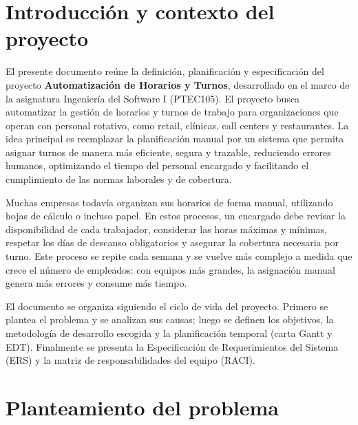 \documentclass[12pt,letterpaper]{article}
\newcommand{\tituloProyecto}{Automatización de Horarios y Turnos}
\begin{document}
\tableofcontents
\newpage
{}

\section{Introducción y contexto del proyecto}

El presente documento reúne la definición, planificación y especificación del proyecto \textbf{\tituloProyecto}, desarrollado en el marco de la asignatura Ingeniería del Software I (PTEC105). El proyecto busca automatizar la gestión de horarios y turnos de trabajo para organizaciones que operan con personal rotativo, como retail, clínicas, call centers y restaurantes. La idea principal es reemplazar la planificación manual por un sistema que permita asignar turnos de manera más eficiente, segura y trazable, reduciendo errores humanos, optimizando el tiempo del personal encargado y facilitando el cumplimiento de las normas laborales y de cobertura.

Muchas empresas todavía organizan sus horarios de forma manual, utilizando hojas de cálculo o incluso papel. En estos procesos, un encargado debe revisar la disponibilidad de cada trabajador, considerar las horas máximas y mínimas, respetar los días de descanso obligatorios y asegurar la cobertura necesaria por turno. Este proceso se repite cada semana y se vuelve más complejo a medida que crece el número de empleados: con equipos más grandes, la asignación manual genera más errores y consume más tiempo.

El documento se organiza siguiendo el ciclo de vida del proyecto. Primero se plantea el problema y se analizan sus causas; luego se definen los objetivos, la metodología de desarrollo escogida y la planificación temporal (carta Gantt y EDT). Finalmente se presenta la Especificación de Requerimientos del Sistema (ERS) y la matriz de responsabilidades del equipo (RACI).

\section{Planteamiento del problema}
\end{document}
